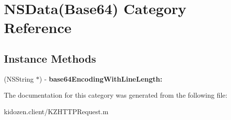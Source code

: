 \hypertarget{category_n_s_data_07_base64_08}{\section{N\-S\-Data(Base64) Category Reference}
\label{category_n_s_data_07_base64_08}
}
\subsection*{Instance Methods}
\begin{DoxyCompactItemize}
\item 
\hypertarget{category_n_s_data_07_base64_08_a4ea03c1f0203d1704e102b22c7e566a5}{(N\-S\-String $\ast$) -\/ {\bfseries base64\-Encoding\-With\-Line\-Length\-:}}\label{category_n_s_data_07_base64_08_a4ea03c1f0203d1704e102b22c7e566a5}

\end{DoxyCompactItemize}


The documentation for this category was generated from the following file\-:\begin{DoxyCompactItemize}
\item 
kidozen.\-client/K\-Z\-H\-T\-T\-P\-Request.\-m\end{DoxyCompactItemize}
